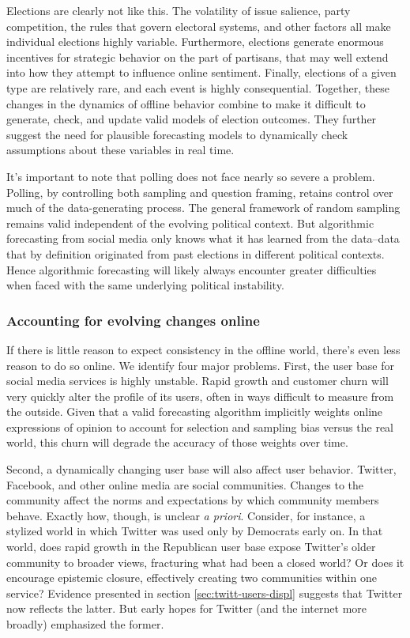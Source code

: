 \documentclass{article}
\begin{document}
Elections are clearly not like this. The volatility of issue salience,
party competition, the rules that govern electoral systems, and other
factors all make individual elections highly variable. Furthermore,
elections generate enormous incentives for strategic behavior on the
part of partisans, that may well extend into how they attempt to
influence online sentiment. Finally, elections of a given type are
relatively rare, and each event is highly consequential. Together,
these changes in the dynamics of offline behavior combine to make it
difficult to generate, check, and update valid models of election
outcomes. They further suggest the need for plausible forecasting
models to dynamically check assumptions about these variables in real
time. 

It's important to note that polling does not face nearly so severe a
problem. Polling, by controlling both sampling and question framing,
retains control over much of the data-generating process. The general
framework of random sampling remains valid independent of the evolving
political context. But algorithmic forecasting from social media only
knows what it has learned from the data--data that by definition
originated from past elections in different political contexts. Hence
algorithmic forecasting will likely always encounter greater difficulties when faced
with the same underlying political instability.


\subsubsection{Accounting for evolving changes online}
\label{sec:acco-evolv-chang-1}

If there is little reason to expect consistency in the offline world,
there's even less reason to do so online. We identify four major
problems. First, the user base for social media services is highly
unstable. Rapid growth and customer churn will very quickly alter the
profile of its users, often in ways difficult to measure from the outside. Given that a valid forecasting algorithm
implicitly weights online expressions of opinion to account for
selection and sampling bias versus the real world, this churn will
degrade the accuracy of those weights over time.

Second, a dynamically changing user base will also affect user
behavior. Twitter, Facebook, and other online media are social
communities. Changes to the community affect the norms and
expectations by which community members behave. Exactly how, though,
is unclear \textit{a priori}. Consider, for instance, a stylized world
in which Twitter was used only by Democrats early on. In that world,
does rapid growth in the Republican user base expose Twitter's older
community to broader views, fracturing what had been a closed world?
Or does it encourage epistemic closure, effectively creating two
communities within one service? Evidence presented in section
\ref{sec:twitt-users-displ} suggests that Twitter now reflects the
latter. But early hopes for Twitter (and the internet more broadly)
emphasized the former. 
\end{document}
